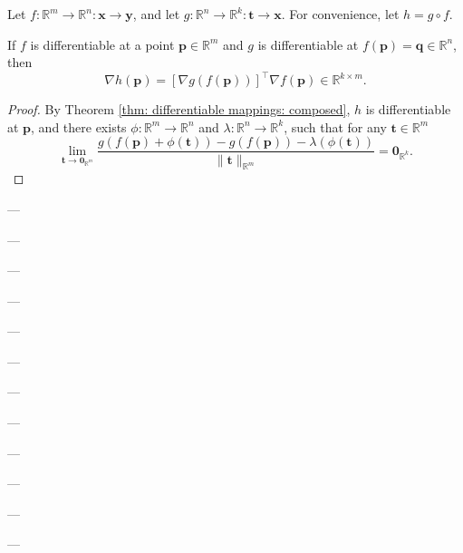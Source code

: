 \begin{theorem}
	\label{thm: chain rule}
	
	Let $f: \mathbb R^m \to \mathbb R^n: \mathbf x \to \mathbf y$, and let $g: \mathbb R^n \to \mathbb R^k: \mathbf t \to \mathbf x$. For convenience, let $h = g \circ f$.
	
	If $f$ is differentiable at a point $\mathbf p \in \mathbb R^m$ and $g$ is differentiable at $f(\mathbf p) = \mathbf q \in \mathbb R^n$, then
	$$
	\nabla h(\mathbf p) = [\nabla g(f(\mathbf p))]^\top \nabla f(\mathbf p) \in \mathbb R^{k \times m}.
	$$
	
	\begin{proof}
		By Theorem \ref{thm: differentiable mappings: composed}, $h$ is differentiable at $\mathbf p$, and there exists $\phi: \mathbb R^m \to \mathbb R^n$ and $\lambda: \mathbb R^n \to \mathbb R^k$, such that for any $\mathbf t \in \mathbb R^m$
		$$
		\lim_{\mathbf t \to \mathbf 0_{\mathbb R^m}} \frac{g(f(\mathbf p) + \phi(\mathbf t)) - g(f(\mathbf p)) - \lambda(\phi(\mathbf t))}{\| \mathbf t \|_{\mathbb R^m}} = \mathbf 0_{\mathbb R^k}.
		$$
	\end{proof}
\end{theorem}







---

---

---

---

---

---

---

---

---

---

---

---















































%